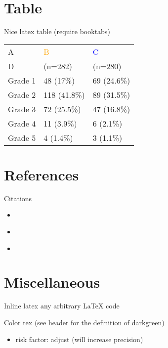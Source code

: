 \documentclass[table]{beamer}
\newcommand{\darkgreen}{green!50!black}
\begin{document}
\section{Table}
\label{sec:org63f91ae}

\begin{frame}[label={sec:orgbc8bfed}]{Nice latex table}
(require booktabs)

\begin{table}
\begin{tabular}{lll}
\toprule
A  & \textcolor{orange}{B} & \textcolor{blue}{C} \\
D & (n=282)  & (n=280) \\
\midrule
Grade 1 & 48 (17\%)  & 69 (24.6\%) \\
Grade 2 & 118 (41.8\%)  & 89 (31.5\%) \\
Grade 3 & 72 (25.5\%)  & 47 (16.8\%) \\
Grade 4 & 11 (3.9\%) & 6 (2.1\%) \\
Grade 5 & 4 (1.4\%)  & 3 (1.1\%) \\
\bottomrule
\end{tabular}
\end{table}
\end{frame}

\section{References}
\label{sec:orgc63bc24}

\begin{frame}[label={sec:org51c1c9c}]{Citations}
\begin{itemize}
\item \citep{pearson1905problem}
\item \cite{pearson1905problem}
\item \citep[xx]{pearson1905problem}
\end{itemize}
\cite[p.~150]{pearson1905problem}
\end{frame}

\section{Miscellaneous}
\label{sec:org8312b6b}

\begin{frame}[label={sec:org35eb60d}]{Inline latex}
any arbitrary LaTeX code
\end{frame}

\begin{frame}[label={sec:org63285b9}]{Color tex}
(see header for the definition of darkgreen)
\begin{itemize}
\item \textcolor{\darkgreen}{risk factor}: adjust (will increase precision)
\end{itemize}
\end{frame}
\end{document}
